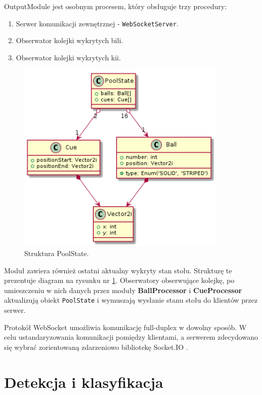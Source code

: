\documentclass[12pt]{article}
\begin{document}
OutputModule jest osobnym procesem, który obsługuje trzy procedury:
\begin{enumerate} [noitemsep]
    \item Serwer komunikacji zewnętrznej - \lstinline{WebSocketServer}.
    \item Obserwator kolejki wykrytych bili.
    \item Obserwator kolejki wykrytych kii.
\end{enumerate}

\begin{figure}[h]
    \centering
    \includegraphics[width=10cm]{./diagrams/out/pull_state_cd.png}
    \caption{Struktura PoolState.}
    \label{poolstate}
\end{figure}

Moduł zawiera również ostatni aktualny wykryty stan stołu. Strukturę te prezentuje diagram na rysunku nr \ref{poolstate}.
Obserwatory obserwujące kolejkę, po umieszczeniu w nich danych przez moduły \textbf{BallProcessor} i \textbf{CueProcessor} aktualizują obiekt \lstinline{PoolState} i wymuszają wysłanie stanu stołu do klientów przez serwer.

Protokół WebSocket umożliwia komunikację full-duplex w dowolny sposób. W celu ustandaryzowania komunikacji pomiędzy klientami, a serwerem zdecydowano się wybrać zorientowaną zdarzeniowo bibliotekę Socket.IO \cite{socket.io}.


\section{Detekcja i klasyfikacja}
\end{document}
